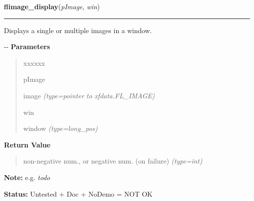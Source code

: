 \hspace{.8\funcindent}\begin{boxedminipage}{\funcwidth}

    \raggedright \textbf{flimage\_display}(\textit{pImage}, \textit{win})

    \vspace{-1.5ex}

    \rule{\textwidth}{0.5\fboxrule}
\setlength{\parskip}{2ex}

Displays a single or multiple images in a window.

-{}-
\setlength{\parskip}{1ex}
      \textbf{Parameters}
      \vspace{-1ex}

      \begin{quote}
        \begin{Ventry}{xxxxxx}

          \item[pImage]


image
            {\it (type=pointer to xfdata.FL\_IMAGE)}

          \item[win]


window
            {\it (type=long\_pos)}

        \end{Ventry}

      \end{quote}

      \textbf{Return Value}
    \vspace{-1ex}

      \begin{quote}

non-negative num., or negative num. (on failure)
      {\it (type=int)}

      \end{quote}

\textbf{Note:} 
e.g. \emph{todo}


\textbf{Status:} 
Untested + Doc + NoDemo = NOT OK


    \end{boxedminipage}

    \label{xformslib:flflimage:flimage_sdisplay}

    \vspace{0.5ex}

